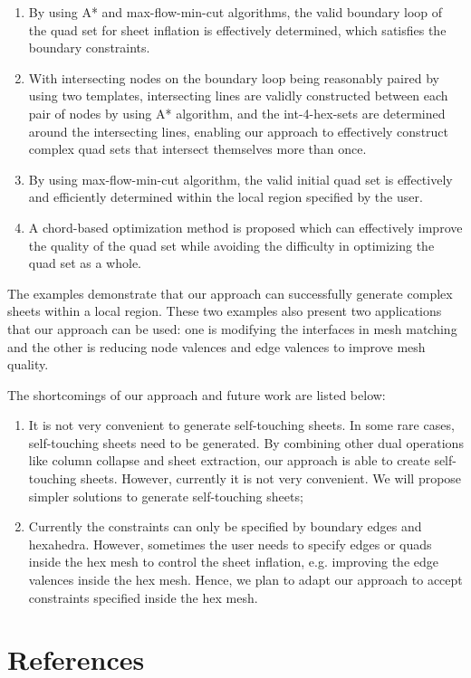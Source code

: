 \documentclass[final,5p,times,twocolumn]{elsarticle}
\begin{document}
\begin{enumerate}
  \item By using A* and max-flow-min-cut algorithms, the valid boundary loop of the quad set for sheet inflation is effectively determined, which satisfies the boundary constraints.
  \item With intersecting nodes on the boundary loop being reasonably paired by using two templates, intersecting lines are validly constructed between each pair of nodes by using A* algorithm, and the int-4-hex-sets are determined around the intersecting lines, enabling our approach to effectively construct complex quad sets that intersect themselves more than once.
  \item By using max-flow-min-cut algorithm, the valid initial quad set is effectively and efficiently determined within the local region specified by the user.
  \item A chord-based optimization method is proposed which can effectively improve the quality of the quad set while avoiding the difficulty in optimizing the quad set as a whole.
\end{enumerate}

The examples demonstrate that our approach can successfully generate complex sheets within a local region. These two examples also present two applications that our approach can be used: one is modifying the interfaces in mesh matching and the other is reducing node valences and edge valences to improve mesh quality.

The shortcomings of our approach and future work are listed below:
\begin{enumerate}
  \item It is not very convenient to generate self-touching sheets. In some rare cases, self-touching sheets need to be generated. By combining other dual operations like column collapse and sheet extraction, our approach is able to create self-touching sheets. However, currently it is not very convenient. We will propose simpler solutions to generate self-touching sheets;
  \item Currently the constraints can only be specified by boundary edges and hexahedra. However, sometimes the user needs to specify edges or quads inside the hex mesh to control the sheet inflation, e.g. improving the edge valences inside the hex mesh. Hence, we plan to adapt our approach to accept constraints specified inside the hex mesh. 
\end{enumerate}

\section*{References}


\end{document}
